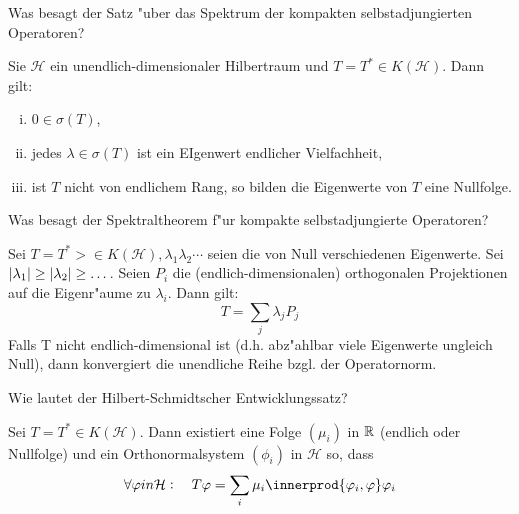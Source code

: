 \documentclass[9pt]{article}
\newcommand{\R}[1]{%
	\ifthenelse{\equal{#1}{}}
	{\mathbb{R}}
	{\mathbb{R}^{#1}}}%
\DeclarePairedDelimiter{\innerprod}\langle\rangle
\newcommand{\Hi}{\mathcal{H}}
\newenvironment{field}{}{\newpage}
\newif\ifnote
\newenvironment{note}{\notetrue}{\notefalse}
\newcommand{\localtag}{}
\newcommand{\globaltag}{}
\newcommand{\uuid}{}
\newcommand{\tags}[1]{
    \ifnote 
        \renewcommand{\localtag}{#1}
    \else
        \renewcommand{\globaltag}{#1}
    \fi 
    }
\newcommand{\xplain}[1]{\renewcommand{\uuid}{#1}}
\begin{document}
\begin{note}
	\xplain{f523d7a1-96ed-4dad-addb-b26c2802745f}
	\tags{7.2.1}
	
	\begin{field}  %
		Was besagt der Satz "uber das Spektrum der kompakten selbstadjungierten Operatoren?
	\end{field}
	
	\begin{field}  %
		Sie $\Hi$ ein unendlich-dimensionaler Hilbertraum und $T=T^* \in K(\Hi)$. Dann gilt: 
		\begin{enumerate}[i)]
			\item $0 \in \sigma(T)$,
			\item jedes $\lambda \in \sigma(T)$ ist ein EIgenwert endlicher Vielfachheit,
			\item ist $T$ nicht von endlichem Rang, so bilden die Eigenwerte von $T$ eine Nullfolge.
		\end{enumerate}
	\end{field}
\end{note}
\begin{note}
	\xplain{fb2138d7-0fbb-455c-9d0d-7266a21c89d4}
	\tags{7.2.2}
	
	\begin{field}  %
		Was besagt der Spektraltheorem f"ur kompakte selbstadjungierte Operatoren?
	\end{field}
	
	\begin{field}  %
		Sei $T=T^*> \in K(\Hi), \lambda_1 \lambda_2 \cdots$ seien die von Null verschiedenen Eigenwerte. Sei $\abs{\lambda_1} \geq \abs{\lambda_2}\geq \dots$. Seien $P_i$ die (endlich-dimensionalen) orthogonalen Projektionen auf die Eigenr"aume zu $\lambda_i$. Dann gilt:
		\begin{equation*}
			T = \sum_{j} \lambda_jP_j
		\end{equation*}
		Falls T nicht endlich-dimensional ist (d.h. abz"ahlbar viele Eigenwerte ungleich Null), dann konvergiert die unendliche Reihe bzgl. der Operatornorm.
	\end{field}
\end{note}
\begin{note}
	\xplain{27aa296d-0be5-4094-a837-a0c32a57d34e}
	\tags{7.2.3}
	
	\begin{field}  %
		Wie lautet der Hilbert-Schmidtscher Entwicklungssatz?
	\end{field}
	
	\begin{field}  %
		Sei $T=T^* \in K(\Hi)$. Dann existiert eine Folge $(\mu_i)$ in $\R{}$ (endlich oder Nullfolge) und ein Orthonormalsystem $(\phi_i)$ in $\Hi$ so, dass
		\begin{equation*}
			\forall \varphi in \Hi: \quad T\varphi = \sum_i \mu_i \innerprod{\varphi_i, \varphi}\varphi_i
		\end{equation*}
	\end{field}
\end{note}
\end{document}
